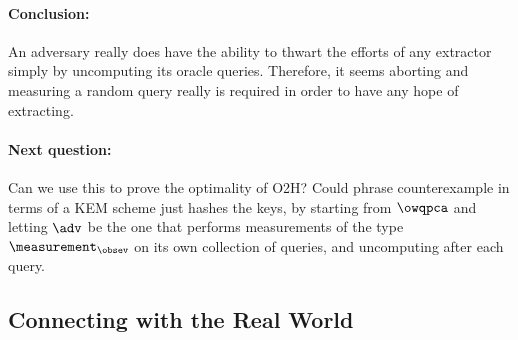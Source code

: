     \paragraph{Conclusion:} An adversary really does have the ability to thwart the efforts
      of any extractor simply by uncomputing its oracle queries.
      Therefore, it seems aborting and measuring a random query really is
      required in order to have any hope of extracting.

    \paragraph{Next question:} Can we use this to prove the optimality of O2H?
      Could phrase counterexample in terms of a KEM scheme just hashes the
      keys, by starting from $\owqpca$ and letting $\adv$ be the one that
      performs measurements of the type $\measurement_\obsev$ on its own
      collection of queries, and uncomputing after each query.

  \subsection{Connecting with the Real World}
  \fi

